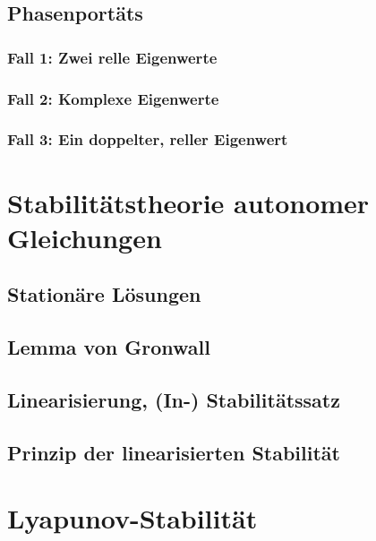 \documentclass[a4paper, 11pt, accentcolor = tud3b]{tudreport}
\begin{document}
			\subsection{Phasenportäts} %

				\subsubsection{Fall 1: Zwei relle Eigenwerte} %

				\subsubsection{Fall 2: Komplexe Eigenwerte} %

				\subsubsection{Fall 3: Ein doppelter, reller Eigenwert} %

		\section{Stabilitätstheorie autonomer Gleichungen} %

			\subsection{Stationäre Lösungen} %

			\subsection{Lemma von Gronwall} %

			\subsection{Linearisierung, (In-) Stabilitätssatz} %

			\subsection{Prinzip der linearisierten Stabilität} %

		\section{Lyapunov-Stabilität} %
\end{document}
